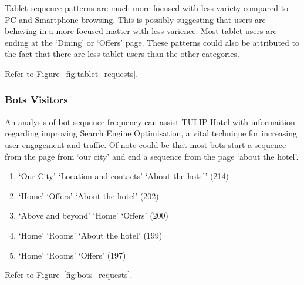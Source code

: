 Tablet sequence patterns are much more focused with less variety compared to PC and Smartphone browsing. This is possibly suggesting that users are behaving in a more focused matter with less varience. Most tablet users are ending at the `Dining' or `Offers' page. These patterns could also be attributed to the fact that there are less tablet users than the other categories.

Refer to Figure~\ref{fig:tablet_requests}.


\subsubsection{Bots Visitors}
\label{sec:results:platform:bots}

An analysis of bot sequence frequency can assist TULIP Hotel with informaition regarding improving Search Engine Optimisation, a vital technique for increasing user engagement and traffic. Of note could be that most bots start a sequence from the page from `our city' and end a sequence from the page `about the hotel'.

\begin{enumerate}
  \item `Our City' \ra{} `Location and contacts' \ra{} `About the hotel' (214)
  \item `Home' \ra{} `Offers' \ra{} `About the hotel' (202)
  \item `Above and beyond' \ra{} `Home' \ra{} `Offers' (200)
  \item `Home' \ra{} `Rooms' \ra{} `About the hotel' (199)
  \item `Home' \ra{} `Rooms' \ra{} `Offers' (197)
\end{enumerate}

Refer to Figure~\ref{fig:bots_requests}.

